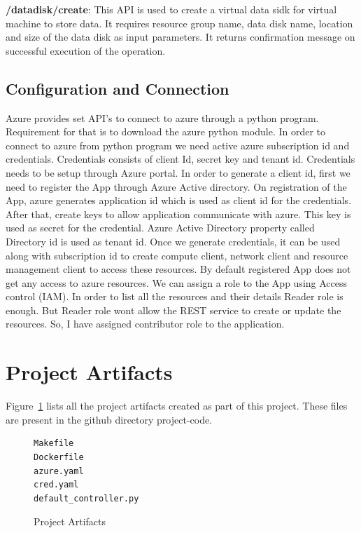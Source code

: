 \begin{description}
\item \textbf{/datadisk/create}: This API is used to create a virtual data sidk
for virtual machine to store data. It requires resource group name, data disk
name, location and size of the data disk as input parameters. It returns
confirmation message on successful execution of the operation.

\end{description}

\subsection{Configuration and Connection}
Azure provides set API's to connect to azure through a python program.
Requirement for that is to download the azure python module. In order to
connect to azure from python program we need active azure subscription id and
credentials. Credentials consists of client Id, secret key and tenant id.
Credentials needs to be setup through Azure portal. In order to generate a
client id, first we need to register the App through Azure Active directory. On
registration of the App, azure generates application id which is used as client
id for the credentials. After that, create keys to allow application
communicate with azure. This key is used as secret for the credential. Azure
Active Directory property called Directory id is used as tenant id. Once we
generate credentials, it can be used along with subscription id to create
compute client, network client and resource management client to access these
resources. By default registered App does not get any access to azure
resources. We can assign a role to the App using Access control (IAM). In order
to list all the resources and their details Reader role is enough. But Reader
role wont allow the REST service to create or update the resources. So, I have
assigned contributor role to the application.


\section{Project Artifacts}

Figure~\ref{fig:project-artifacts} lists all the project artifacts created
as part of this project. These files are present in the github directory
project-code.

\begin{figure}[htb]
\begin{verbatim}
Makefile
Dockerfile
azure.yaml
cred.yaml
default_controller.py
\end{verbatim}
\caption{Project Artifacts}\label{fig:project-artifacts}
\end{figure}

